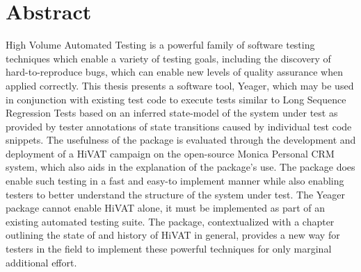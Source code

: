 \doublespacing
\chapter*{Abstract}
\abstract{}
 High Volume Automated Testing is a powerful family of software testing techniques which enable a variety of testing goals, including the discovery of hard-to-reproduce bugs, which can enable new levels of quality assurance when applied correctly. This thesis presents a software tool, Yeager, which may be used in conjunction with existing test code to execute tests similar to Long Sequence Regression Tests based on an inferred state-model of the system under test as provided by tester annotations of state transitions caused by individual test code snippets. The usefulness of the package is evaluated through the development and deployment of a HiVAT campaign on the open-source Monica Personal CRM system, which also aids in the explanation of the package's use. The package does enable such testing in a fast and easy-to implement manner while also enabling testers to better understand the structure of the system under test. The Yeager package cannot enable HiVAT alone, it must be implemented as part of an existing automated testing suite. The package, contextualized with a chapter outlining the state of and history of HiVAT in general, provides a new way for testers in the field to implement these powerful techniques for only marginal additional effort.
